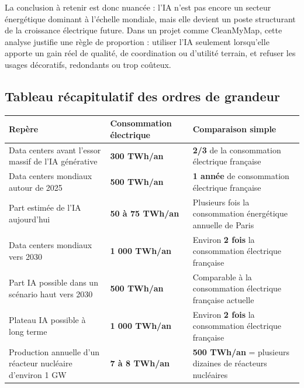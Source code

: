 \documentclass[
  10pt,
  a4paper,
  DIV=11,
  numbers=noendperiod,
  oneside]{scrreprt}
\newcounter{none} %
\let\oldtextbf\textbf
\renewcommand{\textbf}[1]{\oldtextbf{\textcolor{cmmnavy}{#1}}}
\begin{document}
La conclusion à retenir est donc nuancée : l'IA n'est pas encore un
secteur énergétique dominant à l'échelle mondiale, mais elle devient un
poste structurant de la croissance électrique future. Dans un projet
comme CleanMyMap, cette analyse justifie une règle de proportion :
utiliser l'IA seulement lorsqu'elle apporte un gain réel de qualité, de
coordination ou d'utilité terrain, et refuser les usages décoratifs,
redondants ou trop coûteux.

\subsection{Tableau récapitulatif des ordres de
grandeur}\label{tableau-ruxe9capitulatif-des-ordres-de-grandeur}

{\def\LTcaptype{none} %
\begin{longtable}[]{@{}
  >{\raggedright\arraybackslash}p{}
  >{\raggedleft\arraybackslash}p{}
  >{\raggedright\arraybackslash}p{}@{}}
\toprule\noalign{}
\begin{minipage}[b]{\linewidth}\raggedright
Repère
\end{minipage} & \begin{minipage}[b]{\linewidth}\raggedleft
Consommation électrique
\end{minipage} & \begin{minipage}[b]{\linewidth}\raggedright
Comparaison simple
\end{minipage} \\
\midrule\noalign{}
\endhead
\bottomrule\noalign{}
\endlastfoot
Data centers avant l'essor massif de l'IA générative & \textbf{300
TWh/an} & \textbf{2/3} de la consommation électrique française \\
Data centers mondiaux autour de 2025 & \textbf{500 TWh/an} & \textbf{1
année} de consommation électrique française \\
Part estimée de l'IA aujourd'hui & \textbf{50 à 75 TWh/an} & Plusieurs
fois la consommation énergétique annuelle de Paris \\
Data centers mondiaux vers 2030 & \textbf{1 000 TWh/an} & Environ
\textbf{2 fois} la consommation électrique française \\
Part IA possible dans un scénario haut vers 2030 & \textbf{500 TWh/an} &
Comparable à la consommation électrique française actuelle \\
Plateau IA possible à long terme & \textbf{1 000 TWh/an} & Environ
\textbf{2 fois} la consommation électrique française \\
Production annuelle d'un réacteur nucléaire d'environ 1 GW & \textbf{7 à
8 TWh/an} & \textbf{500 TWh/an} = plusieurs dizaines de réacteurs
nucléaires \\
\end{longtable}
}
\end{document}
